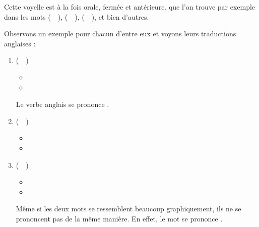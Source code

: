 Cette voyelle est à la fois orale, fermée et antérieure. 
que l'on trouve par exemple dans les mots 
(~~),  (~~),  (~~), et bien d'autres.

Observons un exemple pour chacun d'entre eux et voyons leurs
traductions anglaises :\par

\begin{enumerate}
\item {} (~~)
  \begin{itemize}
  \item {}
    \item {}
    \end{itemize}
    Le verbe anglais  se prononce
    \href{https://en.oxforddictionaries.com/definition/create}{}.
\item {} (~~)
  \begin{itemize}
  \item {}
  \item {}
  \end{itemize}
  

\item {} (~~)
  \begin{itemize}
  \item {}
  \item {}
  \end{itemize}
  Même si les deux mots se ressemblent beaucoup graphiquement, ils
  ne se prononcent pas de la même manière. En effet, le mot
   se prononce \href{https://en.oxforddictionaries.com/definition/republic}{}. 
\end{enumerate}

  
\subsection{}\label{subsec:ɛfr}

